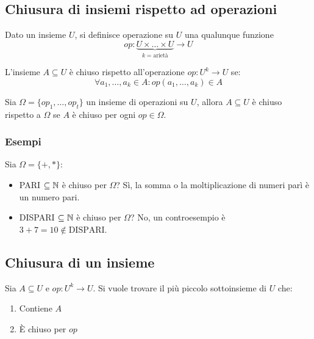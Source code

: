 \subsection*{Chiusura di insiemi rispetto ad operazioni}
Dato un insieme $U$, si definisce operazione su $U$ una qualunque funzione
$$ op: \underbrace{U\times\dots\times U}_{\displaystyle k=\text{arietà}}\to U $$

L'insieme $A\subseteq U$ è chiuso rispetto all'operazione $op:U^k\to U$ se:
$$ \forall a_1,\dots,a_k \in A : op(a_1,\dots,a_k)\in A $$

Sia $\Omega=\{op_1,\dots,op_t\}$ un insieme di operazioni su $U$, allora $A\subseteq U$
è chiuso rispetto a $\Omega$ se $A$ è chiuso per ogni $op\in\Omega$.

\subsubsection*{Esempi}
Sia $\Omega=\{+,*\}$:
\begin{itemize}
    \item PARI $\subseteq\mathbb{N}$ è chiuso per $\Omega$? Sì, la somma o la moltiplicazione di
        numeri parì è un numero pari.
    \item DISPARI $\subseteq\mathbb{N}$ è chiuso per $\Omega$? No, un controesempio è 
        $3+7=10\notin\text{DISPARI}$.
\end{itemize}

\subsection*{Chiusura di un insieme}

\begin{minipage}{.4\textwidth}
    Sia $A\subseteq U$ e $op:U^k\to U$. Si vuole trovare {\color{red}il più piccolo}
    sottoinsieme di $U$ che: \vspace{.2cm}
    \begin{enumerate}
        \setlength\itemsep{.5em}
        \item {\color{blue}Contiene $A$}
        \item {\color{blue}È chiuso per $op$}
    \end{enumerate}
\end{minipage}
\begin{minipage}{.55\textwidth}
    \begin{center}
        
    \end{center}
\end{minipage}
\vspace{.3cm}

